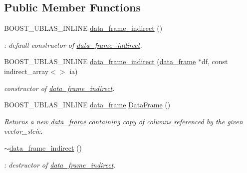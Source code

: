 \subsection*{Public Member Functions}
\begin{DoxyCompactItemize}
\item 
B\+O\+O\+S\+T\+\_\+\+U\+B\+L\+A\+S\+\_\+\+I\+N\+L\+I\+NE \hyperlink{classboost_1_1numeric_1_1ublas_1_1data__frame__indirect_ae5608a899ae84a034623c225837df32b}{data\+\_\+frame\+\_\+indirect} ()
\begin{DoxyCompactList}\small\item\em \+: default constructor of \hyperlink{classboost_1_1numeric_1_1ublas_1_1data__frame__indirect}{data\+\_\+frame\+\_\+indirect}. \end{DoxyCompactList}\item 
B\+O\+O\+S\+T\+\_\+\+U\+B\+L\+A\+S\+\_\+\+I\+N\+L\+I\+NE \hyperlink{classboost_1_1numeric_1_1ublas_1_1data__frame__indirect_a5288eed2b410cc5f084069f70182da17}{data\+\_\+frame\+\_\+indirect} (\hyperlink{classboost_1_1numeric_1_1ublas_1_1data__frame}{data\+\_\+frame} $\ast$df, const indirect\+\_\+array$<$$>$ ia)
\begin{DoxyCompactList}\small\item\em constructor of \hyperlink{classboost_1_1numeric_1_1ublas_1_1data__frame__indirect}{data\+\_\+frame\+\_\+indirect}. \end{DoxyCompactList}\item 
B\+O\+O\+S\+T\+\_\+\+U\+B\+L\+A\+S\+\_\+\+I\+N\+L\+I\+NE \hyperlink{classboost_1_1numeric_1_1ublas_1_1data__frame}{data\+\_\+frame} \hyperlink{classboost_1_1numeric_1_1ublas_1_1data__frame__indirect_a0a1d19ddcd138dea692b737b51fb67c1}{Data\+Frame} ()
\begin{DoxyCompactList}\small\item\em Returns a new \hyperlink{classboost_1_1numeric_1_1ublas_1_1data__frame}{data\+\_\+frame} containing copy of columns referenced by the given vector\+\_\+slcie. \end{DoxyCompactList}\item 
\hyperlink{classboost_1_1numeric_1_1ublas_1_1data__frame__indirect_ae8bfdb6903ce012f122f56ed6e4d20f7}{$\sim$data\+\_\+frame\+\_\+indirect} ()
\begin{DoxyCompactList}\small\item\em \+: destructor of \hyperlink{classboost_1_1numeric_1_1ublas_1_1data__frame__indirect}{data\+\_\+frame\+\_\+indirect}. \end{DoxyCompactList}\item 
$$
\end{DoxyCompactItemize}
